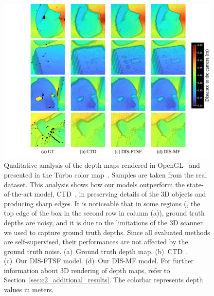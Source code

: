\begin{figure}[t]
    \begin{center}
    \includegraphics[width=1.0\linewidth]{images/chapter2/supp_figures/rendered_real.jpg}
    \end{center}
   \caption{Qualitative analysis of the depth maps rendered in OpenGL~\cite{shreiner2013opengl} and presented in the Turbo color map~\cite{mikhailov2019turbo}. Samples are taken from the real dataset. This analysis shows how our models outperform the state-of-the-art model, CTD~\cite{riegler2019connecting}, in preserving details of the 3D objects and producing sharp edges. It is noticeable that in some regions (\eg, the top edge of the box in the second row in column (a)), ground truth depths are noisy, and it is due to the limitations of the 3D scanner we used to capture ground truth depths. Since all evaluated methods are self-supervised, their performances are not affected by the ground truth noise. (a)~Ground truth depth map. (b)~CTD~\cite{riegler2019connecting}. (c)~Our DIS-FTSF model. (d)~Our DIS-MF model. For further information about 3D rendering of depth maps, refer to Section~\ref{sec:c2_additional_results}. The colorbar represents depth values in meters.}
    \label{fig:c2_rendered_real}
\end{figure}
